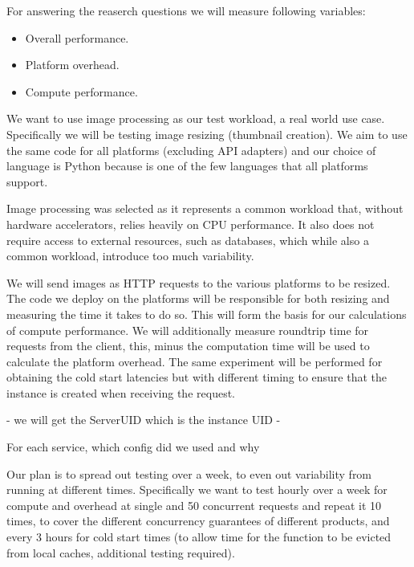 \documentclass[11pt]{article}
\begin{document}
For answering the reaserch questions we will measure following variables:

\begin{itemize}
\item Overall performance.  
\item Platform overhead.
\item Compute performance.
\end{itemize}

We want to use image processing as our test workload, a real world \cite{ii} use case. Specifically we will be testing image resizing (thumbnail creation). We aim to use the same code for all platforms (excluding API adapters) and our choice of language is Python because is one of the few languages that all platforms support. 

Image processing was selected as it represents a common workload that, without hardware accelerators, relies heavily on CPU performance. It also does not require access to external resources, such as databases, which while also a common workload, introduce too much variability.

We will send images as HTTP requests to the various platforms to be resized. The code we deploy on the platforms will be responsible for both resizing and measuring the time it takes to do so. This will form the basis for our calculations of compute performance. We will additionally measure roundtrip time for requests from the client, this, minus the computation time will be used to calculate the platform overhead.  The same experiment will be performed for obtaining the cold start latencies but with different timing to ensure that the instance is created when receiving the request.



- we will get the ServerUID which is the instance UID
- 




For each service, which config did we used and why 








Our plan is to spread out testing over a week, to even out variability from running at different times. Specifically we want to test hourly over a week for compute and overhead at single and 50 concurrent requests and repeat it 10 times, to cover the different concurrency guarantees of different products, and every 3 hours for cold start times (to allow time for the function to be evicted from local caches, additional testing required).
\end{document}
